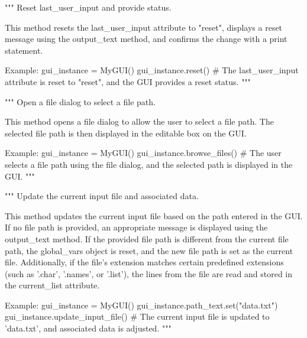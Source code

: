 \begin{codebox}
"""
Reset last_user_input and provide status.

This method resets the last_user_input attribute to "reset", displays a reset message using the output_text
method, and confirms the change with a print statement.

Example:
    gui_instance = MyGUI()
    gui_instance.reset()
    # The last_user_input attribute is reset to "reset", and the GUI provides a reset status.
"""
\end{codebox}

\begin{codebox}
"""
Open a file dialog to select a file path.

This method opens a file dialog to allow the user to select a file path. The selected file path is then
displayed in the editable box on the GUI.

Example:
    gui_instance = MyGUI()
    gui_instance.browse_files()
    # The user selects a file path using the file dialog, and the selected path is displayed in the GUI.
"""
\end{codebox}

\begin{codebox}
"""
Update the current input file and associated data.

This method updates the current input file based on the path entered in the GUI. If no file path
is provided, an appropriate message is displayed using the output_text method. If the provided
file path is different from the current file path, the global_vars object is reset, and the new
file path is set as the current file. Additionally, if the file's extension matches certain
predefined extensions (such as '.char', '.names', or '.list'), the lines from the file are read
and stored in the current_list attribute.

Example:
    gui_instance = MyGUI()
    gui_instance.path_text.set("data.txt")
    gui_instance.update_input_file()
    # The current input file is updated to 'data.txt', and associated data is adjusted.
"""
\end{codebox}

